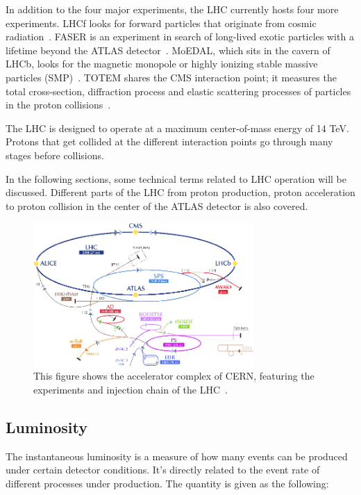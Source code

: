 In addition to the four major experiments, the LHC currently hosts four more experiments. LHCf looks for forward particles that originate from cosmic radiation~\cite{Adriani:926196}. FASER is an experiment in search of long-lived exotic particles with a lifetime beyond the ATLAS detector~\cite{Ariga:2651328}. MoEDAL, which sits in the cavern of LHCb, looks for the magnetic monopole or highly ionizing stable massive particles (SMP)~\cite{Pinfold:1181486}. TOTEM shares the CMS interaction point; it measures the total
cross-section, diffraction process and elastic scattering processes of particles in the proton collisions~\cite{TOTEM:2004hps}. 

The LHC is designed to operate at a maximum center-of-mass energy of 14 TeV. Protons that get collided at the different interaction points go through many stages before collisions. 

In the following sections, some technical terms related to LHC operation will be discussed. Different parts of the LHC from proton production, proton acceleration to proton collision in the center of the ATLAS detector is also covered.

\begin{figure}[!htb]
    \begin{center}
        \includegraphics[width=0.75\textwidth]{figures/chapter_ATLAS/LHCAcceleratorComplex}
        \caption{
			This figure shows the accelerator complex of CERN, featuring the experiments and injection chain of the LHC~\cite{Marcastel:1621583}.
        }
        \label{fig:CERNAcceleratorComplex}
    \end{center}
\end{figure}

\subsection{Luminosity}
The instantaneous luminosity is a measure of how many events can be produced under certain detector conditions. It's directly related to the event rate of different processes under production.   
The quantity is given as the following:

